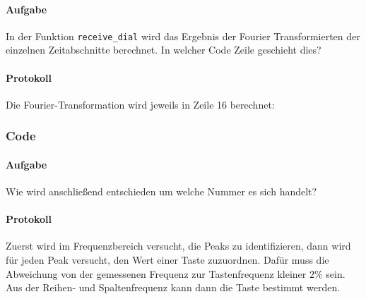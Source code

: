 \documentclass[10pt]{scrreprt}
\begin{document}
        \paragraph{Aufgabe}
        In der Funktion \texttt{receive\_dial} wird das Ergebnis der Fourier Transformierten der
        einzelnen Zeitabschnitte berechnet. In welcher Code Zeile geschieht dies?

        \paragraph{Protokoll}
        Die Fourier-Transformation wird jeweils in Zeile 16 berechnet:
        


        \subsubsection{Code}
        \paragraph{Aufgabe}
        Wie wird anschließend entschieden um welche Nummer es sich handelt?

        \paragraph{Protokoll}
        Zuerst wird im Frequenzbereich versucht, die Peaks zu identifizieren,
        dann wird für jeden Peak versucht, den Wert einer Taste
        zuzuordnen. Dafür muss die Abweichung von der gemessenen Frequenz zur
        \glqq{}Tastenfrequenz\grqq{} kleiner $2\%$ sein. Aus der Reihen- und
        Spaltenfrequenz kann dann die Taste bestimmt werden.
        
\end{document}
